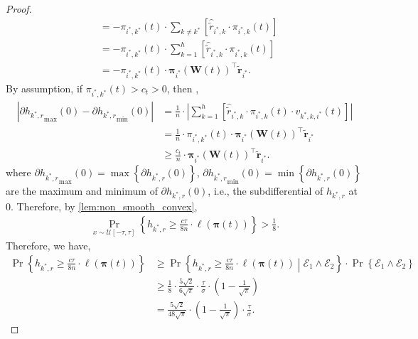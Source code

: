 \documentclass[10pt]{article}
\def\rvtilder{{\tilde{\mathbf{r}}}}
\def\rvpi{{\boldsymbol{\pi}}}
\def\rmW{{\mathbf{W}}}
\def\gE{{\mathcal{E}}}
\def\gU{{\mathcal{U}}}
\DeclareMathOperator*{\probability}{Pr}
\begin{document}
\begin{proof}
\begin{equation*}
\begin{split}
	&= - \pi_{i^*,k^*}(t) \cdot \sum\limits_{k\not=k^*}{ \left[ \hat{\tilde{r}}_{i^*,k} \cdot \pi_{i^*,k}(t) \right] } \\
	&= - \pi_{i^*,k^*}(t) \cdot \sum\limits_{k=1}^{h}{ \left[ \hat{\tilde{r}}_{i^*,k} \cdot \pi_{i^*,k}(t) \right] } \\
	&= - \pi_{i^*,k^*}(t) \cdot \rvpi_{i^*}\left(\rmW(t)\right)^\top \rvtilder_{i^*}.
\end{split}
\end{equation*}
By assumption, if $\pi_{i^*,k^*}(t) > c_t > 0$, then ,
\begin{equation*}
\begin{split}
	\left| \partial{h_{k^*,r}}_{\max}{(0)} - \partial{h_{k^*,r}}_{\min}{(0)} \right| &= \frac{1}{n} \cdot \left| \sum\limits_{k=1}^{h}{ \left[ \hat{\tilde{r}}_{i^*,k} \cdot \pi_{i^*,k}(t) \cdot v_{k^*,k,i^*}(t) \right] } \right| \\
	&= \frac{1}{n} \cdot \pi_{i^*,k^*}(t) \cdot \rvpi_{i^*}\left(\rmW(t)\right)^\top \rvtilder_{i^*} \\
	&\ge \frac{c_t}{n} \cdot \rvpi_{i^*}\left(\rmW(t)\right)^\top \rvtilder_{i^*}.
\end{split}
\end{equation*}
where $\partial{h_{k^*,r}}_{\max}{(0)} = \max\left\{ \partial{h_{k^*,r}}{(0)} \right\}$, $\partial{h_{k^*,r}}_{\min}{(0)} = \min\left\{ \partial{h_{k^*,r}}{(0)} \right\}$ are the maximum and minimum of $\partial{h_{k^*,r}}{(0)}$, i.e., the subdifferential of $h_{k^*,r}$ at $0$. Therefore, by \cref{lem:non_smooth_convex},
\begin{equation*}
\begin{split}
	\probability\limits_{x \sim  \gU[-\tau, \tau]}\left\{ h_{k^*,r} \ge \frac{c\tau}{8n} \cdot \ell(\rvpi(t)) \right\} > \frac{1}{8}.
\end{split}
\end{equation*}
Therefore, we have,
\begin{equation}
\label{eq:h_regret_lower_bound}
\begin{split}
	\probability\left\{ h_{k^*,r} \ge \frac{c\tau}{8n} \cdot \ell(\rvpi(t)) \right\} &\ge \probability\left\{ h_{k^*,r} \ge \frac{c\tau}{8n} \cdot \ell(\rvpi(t)) \middle| \gE_1 \land \gE_2 \right\} \cdot \probability\left\{ \gE_1 \land \gE_2 \right\} \\
	&\ge \frac{1}{8} \cdot \frac{5\sqrt{2}}{6\sqrt{\pi}} \cdot \frac{\tau}{\sigma} \cdot \left( 1 - \frac{1}{\sqrt{\pi}} \right) \\
	&= \frac{5\sqrt{2}}{48\sqrt{\pi}} \cdot \left( 1 - \frac{1}{\sqrt{\pi}} \right) \cdot \frac{\tau}{\sigma}.

\end{split}
\end{equation}
\end{proof}
\end{document}
